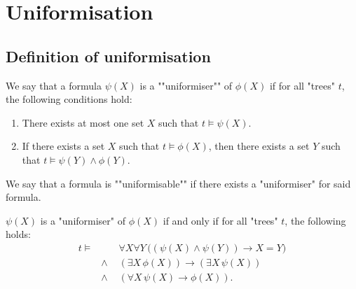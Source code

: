 \documentclass[a4paper,UKenglish,cleveref, autoref, thm-restate]{lipics-v2021}
\begin{document}
\section{Uniformisation}\label{sec:uniformisation}

\subsection{Definition of uniformisation}

\begin{definition}[Uniformiser]\label{def:uniformiser}
	We say that a formula $\psi(X)$ is a ""uniformiser"" of $\phi(X)$ if for all "trees" $t$, the following conditions hold:
	\begin{enumerate}
		\item There exists at most one set $X$ such that $t \models \psi(X)$.
		\item If there exists a set $X$ such that $t \models \phi(X)$, then there exists a set $Y$ such that $t \models \psi(Y) \land \phi(Y)$.
	\end{enumerate}

	We say that a formula is ""uniformisable"" if there exists a "uniformiser" for said formula.
\end{definition}


\iffalse
	\begin{lemma}
		$\psi(X)$ is a "uniformiser" of $\phi(X)$ if and only if for all "trees" $t$, the following holds:
		\begin{eqnarray*}
			t \models &\quad &  \forall X \forall Y \, \Big((\psi(X) \land \psi(Y)) \rightarrow X = Y\Big) \\
			& \land & (\exists X \, \phi(X)) \rightarrow (\exists X \, \psi(X)) \\
			& \land& (\forall X \, \psi(X) \rightarrow \phi(X)).
		\end{eqnarray*}
	\end{lemma}
\end{document}
